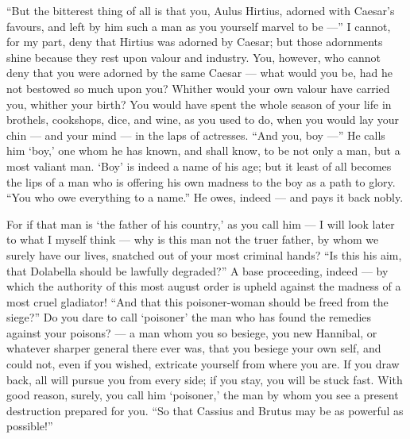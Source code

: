  ``But the bitterest thing of all is that you, Aulus Hirtius, adorned with Caesar's favours, and left by him such a man as you yourself marvel to be ---'' I cannot, for my part, deny that Hirtius was adorned by Caesar; but those adornments shine because they rest upon valour and industry. You, however, who cannot deny that you were adorned by the same Caesar --- what would you be, had he not bestowed so much upon you? Whither would your own valour have carried you, whither your birth? You would have spent the whole season of your life in brothels, cookshops, dice, and wine, as you used to do, when you would lay your chin --- and your mind --- in the laps of actresses. ``And you, boy ---'' He calls him `boy,' one whom he has known, and shall know, to be not only a man, but a most valiant man. `Boy' is indeed a name of his age; but it least of all becomes the lips of a man who is offering his own madness to the boy as a path to glory. ``You who owe everything to a name.'' He owes, indeed --- and pays it back nobly.

 For if that man is `the father of his country,' as you call him --- I will look later to what I myself think --- why is this man not the truer father, by whom we surely have our lives, snatched out of your most criminal hands? ``Is this his aim, that Dolabella should be lawfully degraded?'' A base proceeding, indeed --- by which the authority of this most august order is upheld against the madness of a most cruel gladiator! ``And that this poisoner-woman should be freed from the siege?'' Do you dare to call `poisoner' the man who has found the remedies against your poisons? --- a man whom you so besiege, you new Hannibal, or whatever sharper general there ever was, that you besiege your own self, and could not, even if you wished, extricate yourself from where you are. If you draw back, all will pursue you from every side; if you stay, you will be stuck fast. With good reason, surely, you call him `poisoner,' the man by whom you see a present destruction prepared for you. ``So that Cassius and Brutus may be as powerful as possible!''

